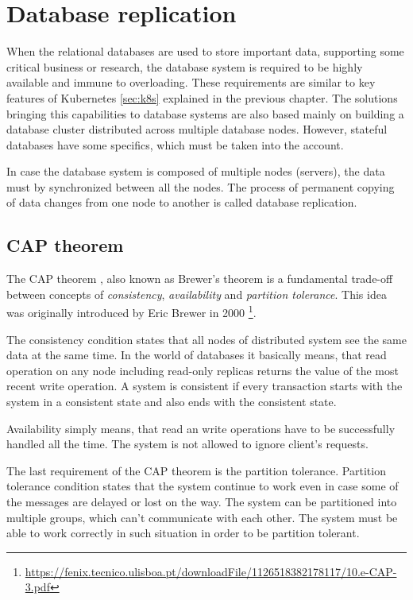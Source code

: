 \documentclass[
  digital, %
  twoside, %
  table,   %
  lof,     %
  lot,     %
]{fithesis3}
\begin{document}
\section{Database replication} \label{sec:db_replication}
When the relational databases are used to store important data, supporting some critical business or research, the database system is required to be highly available and immune to overloading. These requirements are similar to key features of Kubernetes \ref{sec:k8s} explained in the previous chapter. The solutions bringing this capabilities to database systems are also based mainly on building a database cluster distributed across multiple database nodes. However, stateful databases have some specifics, which must be taken into the account.

In case the database system is composed of multiple nodes (servers), the data must by synchronized between all the nodes. The process of permanent copying of data changes from one node to another is called database replication.

\subsection{CAP theorem}
The CAP theorem \cite{cap}, also known as Brewer's theorem is a fundamental trade-off between concepts of \textit{consistency}, \textit{availability} and \textit{partition tolerance}. This idea was originally introduced by Eric Brewer in 2000 \footnote{\url{https://fenix.tecnico.ulisboa.pt/downloadFile/1126518382178117/10.e-CAP-3.pdf}}.

The consistency condition states that all nodes of distributed system see the same data at the same time. In the world of databases it basically means, that read operation on any node including read-only replicas returns the value of the most recent write operation. A system is consistent if every transaction starts with the system in a consistent state and also ends with the consistent state.

Availability simply means, that read an write operations have to be successfully handled all the time. The system is not allowed to ignore client's requests.

The last requirement of the CAP theorem is the partition tolerance. Partition tolerance condition states that the system continue to work even in case some of the messages are delayed or lost on the way. The system can be partitioned into multiple groups, which can't communicate with each other. The system must be able to work correctly in such situation in order to be partition tolerant.
\end{document}
